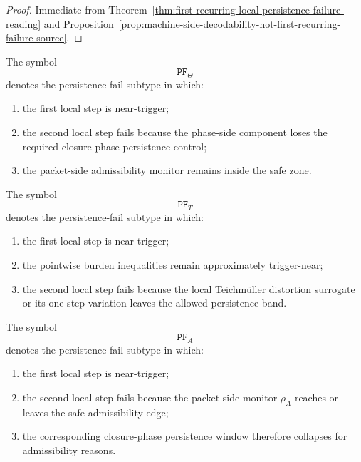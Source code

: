 \begin{proof}
Immediate from Theorem~\ref{thm:first-recurring-local-persistence-failure-reading} and Proposition~\ref{prop:machine-side-decodability-not-first-recurring-failure-source}.
\end{proof}


\begin{definition}
\label{def:theta-drift-persistence-fail-subtype}
The symbol
\[
\mathtt{PF}_{\Theta}
\]
denotes the persistence-fail subtype in which:
\begin{enumerate}
    \item the first local step is near-trigger;
    \item the second local step fails because the phase-side component loses the required closure-phase persistence control;
    \item the packet-side admissibility monitor remains inside the safe zone.
\end{enumerate}
\end{definition}

\begin{definition}
\label{def:teichmueller-distortion-persistence-fail-subtype}
The symbol
\[
\mathtt{PF}_{T}
\]
denotes the persistence-fail subtype in which:
\begin{enumerate}
    \item the first local step is near-trigger;
    \item the pointwise burden inequalities remain approximately trigger-near;
    \item the second local step fails because the local Teichm\"uller distortion surrogate or its one-step variation leaves the allowed persistence band.
\end{enumerate}
\end{definition}

\begin{definition}
\label{def:admissibility-edge-persistence-fail-subtype}
The symbol
\[
\mathtt{PF}_{A}
\]
denotes the persistence-fail subtype in which:
\begin{enumerate}
    \item the first local step is near-trigger;
    \item the second local step fails because the packet-side monitor \(\rho_A\) reaches or leaves the safe admissibility edge;
    \item the corresponding closure-phase persistence window therefore collapses for admissibility reasons.
\end{enumerate}
\end{definition}

